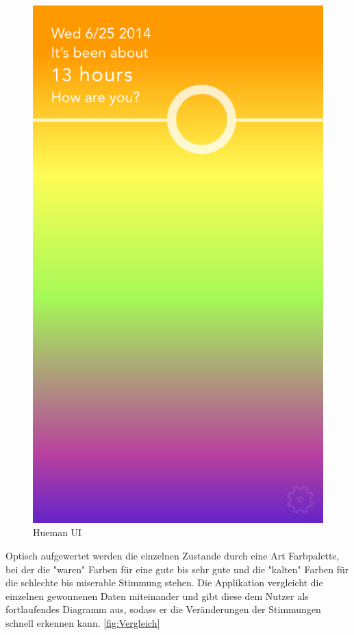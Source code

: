 \begin{figure}[h]
	\centering
	\includegraphics[scale=0.3]{images/hueman-app-main-ui.PNG}
	\caption{Hueman UI \cite{fig:HUI}}
	\label{fig:HUI}
\end{figure}

Optisch aufgewertet werden die einzelnen Zustande durch eine Art Farbpalette, bei der die "waren" Farben für eine gute bis sehr gute und die "kalten" Farben für die schlechte bis miserable Stimmung stehen.
Die Applikation vergleicht die einzelnen gewonnenen Daten miteinander und gibt diese dem Nutzer als fortlaufendes Diagramm aus, sodass er die Veränderungen der Stimmungen schnell erkennen kann.
\ref{fig:Vergleich}

